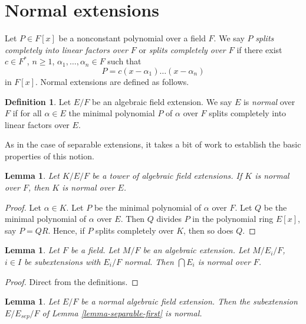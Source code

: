\documentclass{stacks-project}
\theoremstyle{plain}
\newtheorem{lemma}[subsection]{Lemma}
\theoremstyle{definition}
\newtheorem{definition}[subsection]{Definition}
\theoremstyle{remark}
\numberwithin{equation}{subsection}
\begin{document}
\section{Normal extensions}
\label{section-normal}

\noindent
Let $P \in F[x]$ be a nonconstant polynomial over a field $F$. We say $P$
{\it splits completely into linear factors over $F$} or
{\it splits completely over $F$} if there exist
$c \in F^*$, $n \geq 1$, $\alpha_1, \ldots, \alpha_n \in F$ such that
$$
P = c(x - \alpha_1) \ldots (x - \alpha_n)
$$
in $F[x]$. Normal extensions are defined as follows.

\begin{definition}
\label{definition-normal}
Let $E/F$ be an algebraic field extension. We say $E$ is {\it normal}
over $F$ if for all $\alpha \in E$ the minimal polynomial $P$
of $\alpha$ over $F$ splits completely into linear factors over $E$.
\end{definition}

\noindent
As in the case of separable extensions, it takes a bit of work to establish
the basic properties of this notion.

\begin{lemma}
\label{lemma-normal-goes-up}
Let $K/E/F$ be a tower of algebraic field extensions.
If $K$ is normal over $F$, then $K$ is normal over $E$.
\end{lemma}

\begin{proof}
Let $\alpha \in K$. Let $P$ be the minimal polynomial of $\alpha$ over $F$.
Let $Q$ be the minimal polynomial of $\alpha$ over $E$.
Then $Q$ divides $P$ in the polynomial ring $E[x]$, say $P = QR$.
Hence, if $P$ splits completely over $K$, then so does $Q$.
\end{proof}

\begin{lemma}
\label{lemma-intersect-normal}
Let $F$ be a field. Let $M/F$ be an algebraic extension. Let
$M/E_i/F$, $i \in I$ be subextensions with
$E_i/F$ normal. Then $\bigcap E_i$ is normal over $F$.
\end{lemma}

\begin{proof}
Direct from the definitions.
\end{proof}

\begin{lemma}
\label{lemma-separable-first-normal}
Let $E/F$ be a normal algebraic field extension. Then the subextension
$E/E_{sep}/F$ of Lemma \ref{lemma-separable-first} is normal.
\end{lemma}
\end{document}
